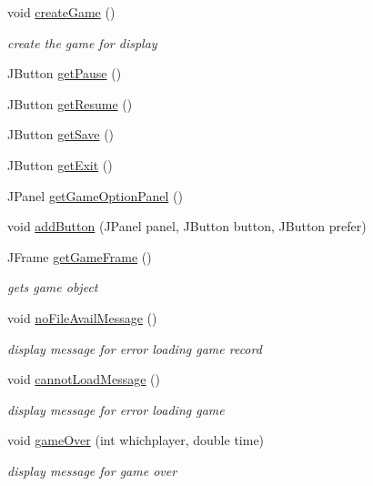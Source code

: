 \begin{DoxyCompactItemize}
void \hyperlink{classview_1_1_game_view_aabb001fdf15e7c066c9dbc588f720cd6}{create\+Game} ()
\begin{DoxyCompactList}\small\item\em create the game for display \end{DoxyCompactList}\item 
J\+Button \hyperlink{classview_1_1_game_view_aaab8ca9baf7dce65a6a523a4b5c73feb}{get\+Pause} ()
\item 
J\+Button \hyperlink{classview_1_1_game_view_aafa4556cc05c088d2ac204f4b78955ca}{get\+Resume} ()
\item 
J\+Button \hyperlink{classview_1_1_game_view_a0da97c49ae783ad3d07bb71c80d3ed81}{get\+Save} ()
\item 
J\+Button \hyperlink{classview_1_1_game_view_ae143f3589b520f0db09dd77e88a73c06}{get\+Exit} ()
\item 
J\+Panel \hyperlink{classview_1_1_game_view_ab86ae5b0ca06d2ed673f43888d5547e5}{get\+Game\+Option\+Panel} ()
\item 
void \hyperlink{classview_1_1_game_view_aebcb9f8b30adbfe48e8ef77754b74b89}{add\+Button} (J\+Panel panel, J\+Button button, J\+Button prefer)
\item 
J\+Frame \hyperlink{classview_1_1_game_view_a35853d75ec07ee29d9257c1785508f02}{get\+Game\+Frame} ()
\begin{DoxyCompactList}\small\item\em gets game object \end{DoxyCompactList}\item 
void \hyperlink{classview_1_1_game_view_a7320789eb48e8b661a1f3a522ef592fb}{no\+File\+Avail\+Message} ()
\begin{DoxyCompactList}\small\item\em display message for error loading game record \end{DoxyCompactList}\item 
void \hyperlink{classview_1_1_game_view_aba828f9bc44d416b7b7c03f71a927dbb}{cannot\+Load\+Message} ()
\begin{DoxyCompactList}\small\item\em display message for error loading game \end{DoxyCompactList}\item 
void \hyperlink{classview_1_1_game_view_aed2c0f38680b0e4ff2ea31c1618416d9}{game\+Over} (int whichplayer, double time)
\begin{DoxyCompactList}\small\item\em display message for game over \end{DoxyCompactList}\item 

\end{DoxyCompactItemize}
